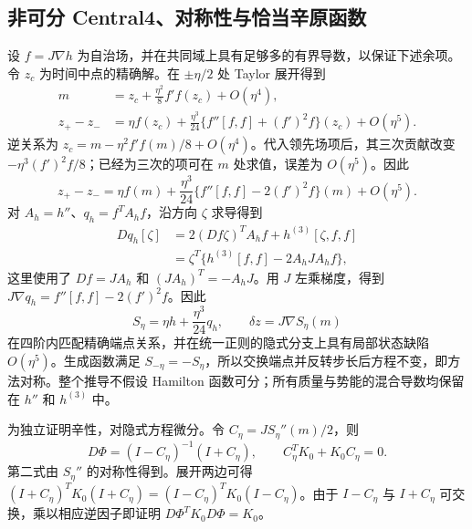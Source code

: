 \subsection{非可分 Central4、对称性与恰当辛原函数}
设 $f=J\nabla h$ 为自治场，并在共同域上具有足够多的有界导数，以保证下述余项。令 $z_c$ 为时间中点的精确解。在 $\pm\eta/2$ 处 Taylor 展开得到
\begin{align}
 m&=z_c+\frac{\eta^2}{8}f'f(z_c)+O(\eta^4),\\
 z_+-z_-&=\eta f(z_c)+\frac{\eta^3}{24}\{f''[f,f]+(f')^2f\}(z_c)+O(\eta^5).
 \label{eq:sup-central-taylor}
\end{align}
逆关系为 $z_c=m-\eta^2f'f(m)/8+O(\eta^4)$。代入领先场项后，其三次贡献改变 $-\eta^3(f')^2f/8$；已经为三次的项可在 $m$ 处求值，误差为 $O(\eta^5)$。因此
\begin{equation}
 z_+-z_-=\eta f(m)+\frac{\eta^3}{24}\{f''[f,f]-2(f')^2f\}(m)+O(\eta^5).
 \label{eq:sup-central-elimination}
\end{equation}
对 $A_h=h''$、$q_h=f^TA_hf$，沿方向 $\zeta$ 求导得到
\begin{align}
 Dq_h[\zeta]
 &=2(Df\zeta)^TA_hf+h^{(3)}[\zeta,f,f]\\
 &=\zeta^T\{h^{(3)}[f,f]-2A_hJA_hf\},
 \label{eq:sup-central-derivative}
\end{align}
这里使用了 $Df=JA_h$ 和 $(JA_h)^T=-A_hJ$。用 $J$ 左乘梯度，得到 $J\nabla q_h=f''[f,f]-2(f')^2f$。因此
\begin{equation}
 S_\eta=\eta h+\frac{\eta^3}{24}q_h,\qquad
 \delta z=J\nabla S_\eta(m)
 \label{eq:sup-central4-method}
\end{equation}
在四阶内匹配精确端点关系，并在统一正则的隐式分支上具有局部状态缺陷 $O(\eta^5)$。生成函数满足 $S_{-\eta}=-S_\eta$，所以交换端点并反转步长后方程不变，即方法对称。整个推导不假设 Hamilton 函数可分；所有质量与势能的混合导数均保留在 $h''$ 和 $h^{(3)}$ 中。

为独立证明辛性，对隐式方程微分。令 $C_\eta=JS_\eta''(m)/2$，则
\begin{equation}
 D\Phi=(I-C_\eta)^{-1}(I+C_\eta),\qquad
 C_\eta^TK_0+K_0C_\eta=0.
 \label{eq:sup-cayley}
\end{equation}
第二式由 $S_\eta''$ 的对称性得到。展开两边可得 $(I+C_\eta)^TK_0(I+C_\eta)=(I-C_\eta)^TK_0(I-C_\eta)$。由于 $I-C_\eta$ 与 $I+C_\eta$ 可交换，乘以相应逆因子即证明 $D\Phi^TK_0D\Phi=K_0$。

